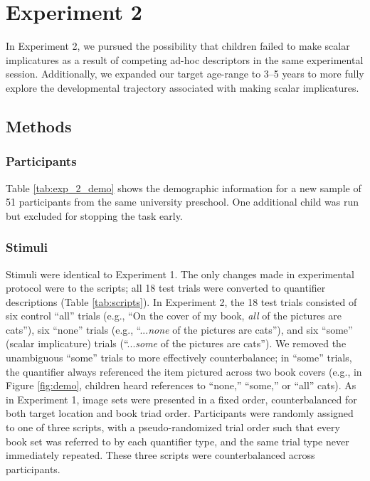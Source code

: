\documentclass[man]{apa2}
\begin{document}
\section{Experiment 2}

In Experiment 2, we pursued the possibility that children failed to make scalar implicatures as a result of competing ad-hoc descriptors in the same experimental session. Additionally, we expanded our target age-range to 3--5 years to more fully explore the developmental trajectory associated with making scalar implicatures.

\subsection{Methods}
\subsubsection{Participants}

Table \ref{tab:exp_2_demo} shows the demographic information for a new sample of 51 participants from the same university preschool. One additional child was run but excluded for stopping the task early. 
\subsubsection{Stimuli}

Stimuli were identical to Experiment 1. The only changes made in experimental protocol were to the scripts;  all 18 test trials were converted to quantifier descriptions (Table \ref{tab:scripts}). In Experiment 2, the 18 test trials consisted of six control ``all'' trials (e.g., ``On the cover of my book, \textit{all} of the pictures are cats''), six ``none'' trials (e.g., ``...\textit{none} of the pictures are cats''), and six ``some'' (scalar implicature) trials (``...\textit{some} of the pictures are cats''). We removed the unambiguous ``some'' trials to more effectively counterbalance; in ``some'' trials, the quantifier always referenced the item pictured across two book covers (e.g., in Figure \ref{fig:demo}, children heard references to ``none,'' ``some,'' or ``all'' cats). As in Experiment 1, image sets were presented in a fixed order, counterbalanced for both target location and book triad order. Participants were randomly assigned to one of three scripts, with a pseudo-randomized trial order such that every book set was referred to by each quantifier type, and the same trial type never immediately repeated. These three scripts were counterbalanced across participants.
\end{document}
